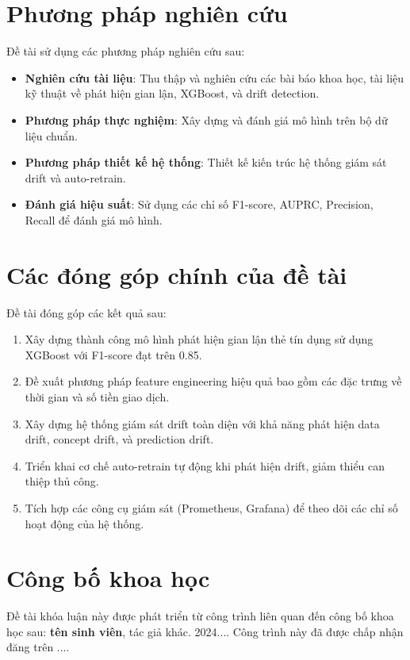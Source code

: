 \section{Phương pháp nghiên cứu}
\label{sec:PhuongPhap}

Đề tài sử dụng các phương pháp nghiên cứu sau:

\begin{itemize}
    \item \textbf{Nghiên cứu tài liệu}: Thu thập và nghiên cứu các bài báo khoa học, tài liệu kỹ thuật về phát hiện gian lận, XGBoost, và drift detection.
    \item \textbf{Phương pháp thực nghiệm}: Xây dựng và đánh giá mô hình trên bộ dữ liệu chuẩn.
    \item \textbf{Phương pháp thiết kế hệ thống}: Thiết kế kiến trúc hệ thống giám sát drift và auto-retrain.
    \item \textbf{Đánh giá hiệu suất}: Sử dụng các chỉ số F1-score, AUPRC, Precision, Recall để đánh giá mô hình.
\end{itemize}

\section{Các đóng góp chính của đề tài}
\label{sec:DongGop}

Đề tài đóng góp các kết quả sau:

\begin{enumerate}
    \item Xây dựng thành công mô hình phát hiện gian lận thẻ tín dụng sử dụng XGBoost với F1-score đạt trên 0.85.
    \item Đề xuất phương pháp feature engineering hiệu quả bao gồm các đặc trưng về thời gian và số tiền giao dịch.
    \item Xây dựng hệ thống giám sát drift toàn diện với khả năng phát hiện data drift, concept drift, và prediction drift.
    \item Triển khai cơ chế auto-retrain tự động khi phát hiện drift, giảm thiểu can thiệp thủ công.
    \item Tích hợp các công cụ giám sát (Prometheus, Grafana) để theo dõi các chỉ số hoạt động của hệ thống.
\end{enumerate}

\section{Công bố khoa học}
Đề tài khóa luận này được phát triển từ công trình liên quan đến công bố khoa học sau: \textbf{tên sinh viên}, tác giả khác. 2024.... Công trình này đã được chấp nhận đăng trên ....

